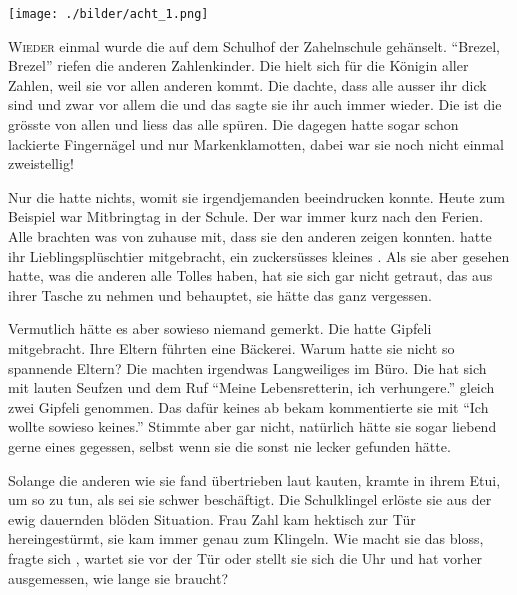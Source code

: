 ﻿\thispagestyle{empty}
\begin{center}
\texttt{[image: ./bilder/acht\_1.png]}
\end{center}
\vspace*{\fill}
{\centering\fontsize{50}{48} \color{farbe}\par}
\newpage
\lettrine[lines=3, lhang=.2, loversize=.25, lraise=0.05, findent=0.1em,
nindent=0em]{W}{ieder} einmal wurde die  auf dem Schulhof der Zahelnschule gehänselt. \enquote{Brezel, Brezel} riefen die anderen Zahlenkinder. Die  hielt sich für die Königin aller Zahlen, weil sie vor allen anderen kommt. Die  dachte, dass alle ausser ihr dick sind und zwar vor allem die  und das sagte sie ihr auch immer wieder. Die  ist die grösste von allen und liess das alle spüren. Die  dagegen hatte sogar schon lackierte Fingernägel und nur Markenklamotten, dabei war sie noch nicht einmal zweistellig!

Nur die  hatte nichts, womit sie irgendjemanden beeindrucken konnte. Heute zum Beispiel war Mitbringtag in der Schule. Der war immer kurz nach den Ferien. Alle brachten was von zuhause mit, dass sie den anderen zeigen konnten.  hatte ihr Lieblingsplüschtier mitgebracht, ein zuckersüsses kleines . Als sie aber gesehen hatte, was die anderen alle Tolles haben, hat sie sich gar nicht getraut, das  aus ihrer Tasche zu nehmen und behauptet, sie hätte das ganz vergessen.

Vermutlich hätte es aber sowieso niemand gemerkt. Die  hatte Gipfeli mitgebracht. Ihre Eltern führten eine Bäckerei. Warum hatte sie nicht so spannende Eltern? Die machten irgendwas Langweiliges im Büro. Die  hat sich mit lauten Seufzen und dem Ruf \enquote{Meine Lebensretterin, ich verhungere.} gleich zwei Gipfeli genommen. Das dafür  keines ab bekam kommentierte sie mit \enquote{Ich wollte sowieso keines.} Stimmte aber gar nicht, natürlich hätte sie sogar liebend gerne eines gegessen, selbst wenn sie die sonst nie lecker gefunden hätte.

Solange die anderen wie sie fand übertrieben laut kauten, kramte  in ihrem Etui, um so zu tun, als sei sie schwer beschäftigt. Die Schulklingel erlöste sie aus der ewig dauernden blöden Situation. Frau Zahl kam hektisch zur Tür hereingestürmt, sie kam immer genau zum Klingeln. Wie macht sie das bloss, fragte sich , wartet sie vor der Tür oder stellt sie sich die Uhr und hat vorher ausgemessen, wie lange sie braucht?

